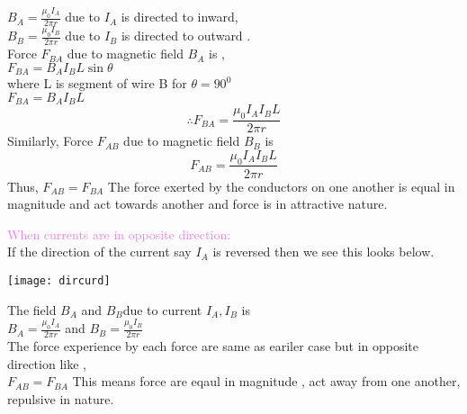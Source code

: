 \documentclass{beamer}
\begin{document}
 
 \begin{frame}
 \hspace{2cm} $B_A=\frac{\mu_0 I_A}{2\pi r}$ due to $I_A$ is directed to inward,\\
\hspace{2cm} $B_B=\frac{\mu_0 I_B}{2\pi r}$  due to $I_B$ is directed to outward .\\
 Force $F_{BA}$ due to magnetic field $B_A$ is ,\\
 \hspace{1cm} $F_{BA}=B_AI_BL\sin\theta$\\
  where L is segment of wire B for $\theta=90^0$\\
   \hspace{3cm} $F_{BA}=B_AI_BL$\\
  \begin{equation}
  \therefore F_{BA}=\frac{\mu_0 I_A I_B L}{2\pi r}
  \end{equation}
 Similarly, Force $F_{AB}$ due to magnetic field $B_B$ is
 \begin{equation}
 F_{AB}=\frac{\mu_0 I_A I_B L}{2\pi r}
 \end{equation}
 Thus, $F_{AB}=F_{BA}$ The force exerted by the conductors on one another is equal in magnitude and act towards another and force is in attractive nature.
 
 \end{frame}
 

\begin{frame}
\textcolor{violet}{When currents are in opposite direction:}\\
If the direction of the current say $I_A$ is reversed then we see this looks below.
\begin{center}
\texttt{[image: dircurd]}
\end{center}
The field $B_A$ and $B_B$due to current $I_A, I_B$ is \\

\hspace{3cm} $B_A=\frac{\mu_0 I_A}{2\pi r}$ and $B_B=\frac{\mu_0 I_B}{2\pi r}$ \\
The force experience by each force are same as eariler case but in opposite direction like ,\\
\hspace{2 cm} $F_{AB}=F_{BA}$
This means force are eqaul in magnitude , act away from one another, repulsive in nature.
\end{frame} 
 
\end{document}
